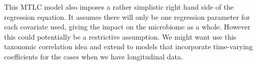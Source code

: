 \documentclass[12pt]{article}
\begin{document}
This MTLC model also imposes a rather simplistic right hand side of the regression equation. It assumes there will only be one regression parameter for each covariate used, giving the impact on the microbiome as a whole. However this could potentially be a restrictive assumption. We might want use this taxonomic correlation idea and extend to models that incorporate time-varying coefficients for the cases when we have longitudinal data.









\begin{singlespace}
\printbibliography
\end{singlespace}
\end{document}
